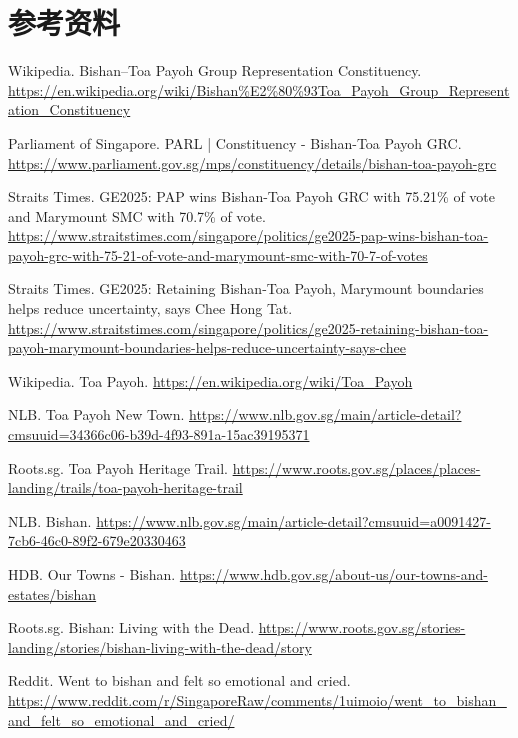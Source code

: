 \documentclass[11pt,a4paper,twoside,openany]{book}
\begin{document}
\section*{参考资料}
\begin{enumerate}[label={[\arabic*]},leftmargin=*,topsep=2pt,itemsep=1pt,parsep=0pt]
  \item Wikipedia. Bishan–Toa Payoh Group Representation Constituency. \url{https://en.wikipedia.org/wiki/Bishan%E2%80%93Toa_Payoh_Group_Representation_Constituency}
  \item Parliament of Singapore. PARL | Constituency - Bishan-Toa Payoh GRC. \url{https://www.parliament.gov.sg/mps/constituency/details/bishan-toa-payoh-grc}
  \item Straits Times. GE2025: PAP wins Bishan-Toa Payoh GRC with 75.21\% of vote and Marymount SMC with 70.7\% of vote. \url{https://www.straitstimes.com/singapore/politics/ge2025-pap-wins-bishan-toa-payoh-grc-with-75-21-of-vote-and-marymount-smc-with-70-7-of-votes}
  \item Straits Times. GE2025: Retaining Bishan-Toa Payoh, Marymount boundaries helps reduce uncertainty, says Chee Hong Tat. \url{https://www.straitstimes.com/singapore/politics/ge2025-retaining-bishan-toa-payoh-marymount-boundaries-helps-reduce-uncertainty-says-chee}
  \item Wikipedia. Toa Payoh. \url{https://en.wikipedia.org/wiki/Toa_Payoh}
  \item NLB. Toa Payoh New Town. \url{https://www.nlb.gov.sg/main/article-detail?cmsuuid=34366c06-b39d-4f93-891a-15ac39195371}
  \item Roots.sg. Toa Payoh Heritage Trail. \url{https://www.roots.gov.sg/places/places-landing/trails/toa-payoh-heritage-trail}
  \item NLB. Bishan. \url{https://www.nlb.gov.sg/main/article-detail?cmsuuid=a0091427-7cb6-46c0-89f2-679e20330463}
  \item HDB. Our Towns - Bishan. \url{https://www.hdb.gov.sg/about-us/our-towns-and-estates/bishan}
  \item Roots.sg. Bishan: Living with the Dead. \url{https://www.roots.gov.sg/stories-landing/stories/bishan-living-with-the-dead/story}
  \item Reddit. Went to bishan and felt so emotional and cried. \url{https://www.reddit.com/r/SingaporeRaw/comments/1uimoio/went_to_bishan_and_felt_so_emotional_and_cried/}
\end{enumerate}
\end{document}
